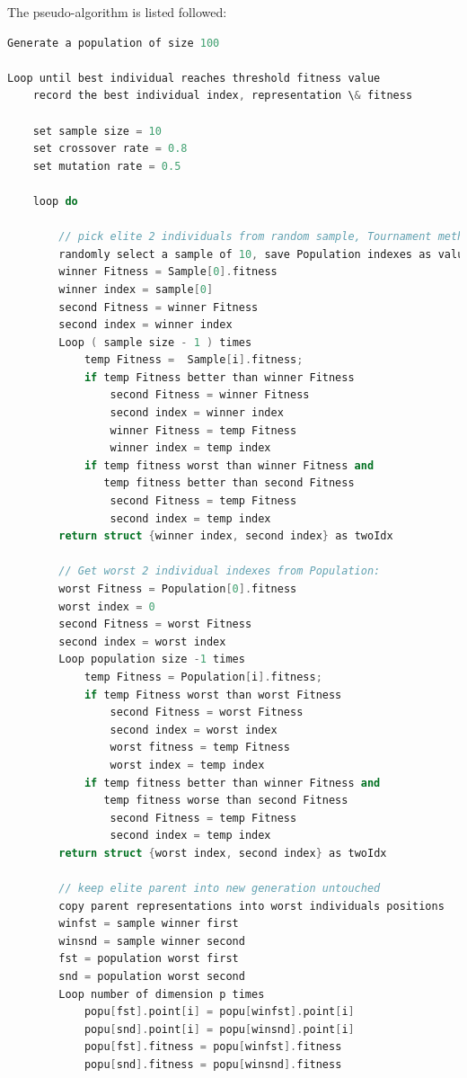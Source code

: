 \documentclass[10pt,b5paper]{article}
\begin{document}
The pseudo-algorithm is listed followed:  
\begin{lstlisting}[language=c++]
Generate a population of size 100

Loop until best individual reaches threshold fitness value
    record the best individual index, representation \& fitness

    set sample size = 10
    set crossover rate = 0.8
    set mutation rate = 0.5

    loop do

        // pick elite 2 individuals from random sample, Tournament method
        randomly select a sample of 10, save Population indexes as value
        winner Fitness = Sample[0].fitness
        winner index = sample[0]
        second Fitness = winner Fitness
        second index = winner index
        Loop ( sample size - 1 ) times
            temp Fitness =  Sample[i].fitness;
            if temp Fitness better than winner Fitness
                second Fitness = winner Fitness
                second index = winner index
                winner Fitness = temp Fitness
                winner index = temp index
            if temp fitness worst than winner Fitness and
               temp fitness better than second Fitness
                second Fitness = temp Fitness
                second index = temp index
        return struct {winner index, second index} as twoIdx

        // Get worst 2 individual indexes from Population:  
        worst Fitness = Population[0].fitness
        worst index = 0
        second Fitness = worst Fitness
        second index = worst index
        Loop population size -1 times
            temp Fitness = Population[i].fitness;
            if temp Fitness worst than worst Fitness
                second Fitness = worst Fitness
                second index = worst index
                worst fitness = temp Fitness
                worst index = temp index
            if temp fitness better than winner Fitness and
               temp fitness worse than second Fitness
                second Fitness = temp Fitness
                second index = temp index
        return struct {worst index, second index} as twoIdx

        // keep elite parent into new generation untouched
        copy parent representations into worst individuals positions
        winfst = sample winner first
        winsnd = sample winner second
        fst = population worst first
        snd = population worst second
        Loop number of dimension p times
            popu[fst].point[i] = popu[winfst].point[i]
            popu[snd].point[i] = popu[winsnd].point[i]
            popu[fst].fitness = popu[winfst].fitness
            popu[snd].fitness = popu[winsnd].fitness


\end{lstlisting}
\end{document}
